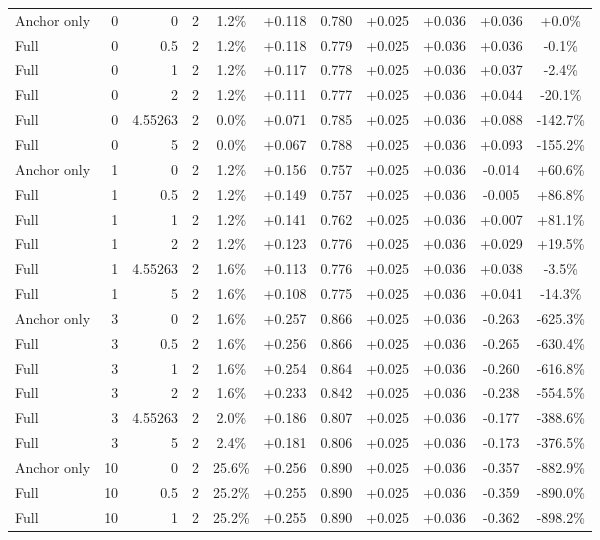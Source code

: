\begin{table}[htbp]
\begin{tabular}{lrrrccccccc}
Anchor only & 0 & 0 & 2 & 1.2\% & +0.118 & 0.780 & +0.025 & +0.036 & +0.036 & +0.0\% \\
Full & 0 & 0.5 & 2 & 1.2\% & +0.118 & 0.779 & +0.025 & +0.036 & +0.036 & -0.1\% \\
Full & 0 & 1 & 2 & 1.2\% & +0.117 & 0.778 & +0.025 & +0.036 & +0.037 & -2.4\% \\
Full & 0 & 2 & 2 & 1.2\% & +0.111 & 0.777 & +0.025 & +0.036 & +0.044 & -20.1\% \\
Full & 0 & 4.55263 & 2 & 0.0\% & +0.071 & 0.785 & +0.025 & +0.036 & +0.088 & -142.7\% \\
Full & 0 & 5 & 2 & 0.0\% & +0.067 & 0.788 & +0.025 & +0.036 & +0.093 & -155.2\% \\
Anchor only & 1 & 0 & 2 & 1.2\% & +0.156 & 0.757 & +0.025 & +0.036 & -0.014 & +60.6\% \\
Full & 1 & 0.5 & 2 & 1.2\% & +0.149 & 0.757 & +0.025 & +0.036 & -0.005 & +86.8\% \\
Full & 1 & 1 & 2 & 1.2\% & +0.141 & 0.762 & +0.025 & +0.036 & +0.007 & +81.1\% \\
Full & 1 & 2 & 2 & 1.2\% & +0.123 & 0.776 & +0.025 & +0.036 & +0.029 & +19.5\% \\
Full & 1 & 4.55263 & 2 & 1.6\% & +0.113 & 0.776 & +0.025 & +0.036 & +0.038 & -3.5\% \\
Full & 1 & 5 & 2 & 1.6\% & +0.108 & 0.775 & +0.025 & +0.036 & +0.041 & -14.3\% \\
Anchor only & 3 & 0 & 2 & 1.6\% & +0.257 & 0.866 & +0.025 & +0.036 & -0.263 & -625.3\% \\
Full & 3 & 0.5 & 2 & 1.6\% & +0.256 & 0.866 & +0.025 & +0.036 & -0.265 & -630.4\% \\
Full & 3 & 1 & 2 & 1.6\% & +0.254 & 0.864 & +0.025 & +0.036 & -0.260 & -616.8\% \\
Full & 3 & 2 & 2 & 1.6\% & +0.233 & 0.842 & +0.025 & +0.036 & -0.238 & -554.5\% \\
Full & 3 & 4.55263 & 2 & 2.0\% & +0.186 & 0.807 & +0.025 & +0.036 & -0.177 & -388.6\% \\
Full & 3 & 5 & 2 & 2.4\% & +0.181 & 0.806 & +0.025 & +0.036 & -0.173 & -376.5\% \\
Anchor only & 10 & 0 & 2 & 25.6\% & +0.256 & 0.890 & +0.025 & +0.036 & -0.357 & -882.9\% \\
Full & 10 & 0.5 & 2 & 25.2\% & +0.255 & 0.890 & +0.025 & +0.036 & -0.359 & -890.0\% \\
Full & 10 & 1 & 2 & 25.2\% & +0.255 & 0.890 & +0.025 & +0.036 & -0.362 & -898.2\% \\

\end{tabular}
\end{table}
